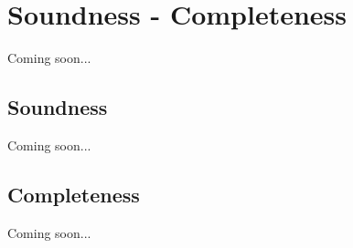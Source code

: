 \chapter{Soundness - Completeness}
Coming soon...
\section{Soundness}
Coming soon...
\section{Completeness}
Coming soon...